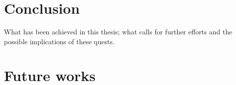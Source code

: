 \chapter{Conclusion}
What has been achieved in this thesis; what calls for further efforts and the possible implications of these quests.

\chapter{Future works}